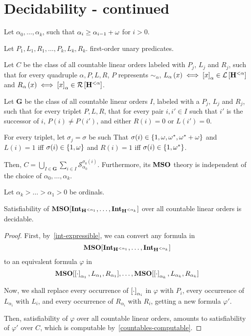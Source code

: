 \section{Decidability - continued}

\begin{lemma}\label{many-ordinals-decomposition}
  Let $\alpha_0, \ldots, \alpha_k$,
  such that $\alpha_{i} \ge \alpha_{i - 1} + \omega$ for $i > 0$.

  Let $P_1, L_1, R_1, \ldots, P_k, L_k, R_k$.
  first-order unary predicates.

  Let $C$ be the class of
  all countable linear orders labeled with $P_j$, $L_j$ and $R_j$,
  such that for every quadruple $\alpha, P, L, R$,
  $P$ represents $\sim_{\alpha}$,
  $L_{\alpha} \left( {x} \right) \iff \left[ {x} \right]_{\alpha} \in \mathcal{L} \left[ {{\mathbf{H}_{}^{< \alpha}}} \right]$ and
  $R_{\alpha} \left( {x} \right) \iff \left[ {x} \right]_{\alpha} \in \mathcal{R} \left[ {{\mathbf{H}_{}^{< \alpha}}} \right]$.

  Let $\mathbf{G}$ be the class of all countable linear orders $I$,
  labeled with a $P_j$, $L_j$ and $R_j$,
  such that for every triplet $P, L, R$,
  that for every pair $i, i' \in I$ such that $i'$ is the successor of $i$,
  $P(i) \ne P(i')$,
  and either $R(i) = 0$ or $L(i') = 0$.

  For every triplet, let $\sigma_j = \sigma$ be such That
  $\sigma(i) \in \left\{ {1, \omega, \omega^\ast, \omega^\ast + \omega} \right\}$ and
  $L(i) = 1$ iff $\sigma(i) \in \left\{ {1, \omega} \right\}$ and
  $R(i) = 1$ iff $\sigma(i) \in \left\{ {1, \omega^\ast} \right\}$.

  Then, $C = \bigcup_{I \in \mathbf{G}} \sum_{i \in I} \mathcal{S}^{\sigma_0(i)}_{\alpha_0}$.
  Furthermore, its $\mathbf{MSO}$ theory is independent of the choice of
  $\alpha_0, \ldots, \alpha_k$.
\end{lemma}


\begin{theorem}\label{many-ordinals-satisfiability}
  Let $\alpha_k > \ldots > \alpha_1 > 0$ be ordinals.

  Satisfiability of $\mathbf{MSO}[\mathbf{Int}_{\mathbf{H}_{}^{< \alpha_1}}, \ldots, \mathbf{Int}_{\mathbf{H}_{}^{< \alpha_k}}]$
  over all countable linear orders is decidable.
\end{theorem}

\begin{proof}
  First, by~\cref{int-expressible}, we can convert
  any formula in
  \[
    \mathbf{MSO}[\mathbf{Int}_{\mathbf{H}_{}^{< \alpha_1}}, \ldots, \mathbf{Int}_{\mathbf{H}_{}^{< \alpha_k}}]
  \]
  to an equivalent formula $\varphi$ in
  \[
    \mathbf{MSO}[\left[ {\cdot} \right]_{\alpha_1}, L_{\alpha_1}, R_{\alpha_1}],
    \ldots,
    \mathbf{MSO}[\left[ {\cdot} \right]_{\alpha_k}, L_{\alpha_k}, R_{\alpha_k}]
  \]

  Now, we shall replace every occurrence of $\left[ {\cdot} \right]_{\alpha_i}$ in $\varphi$ with $P_i$,
  every occurrence of $L_{\alpha_i}$ with $L_i$,
  and every occurrence of $R_{\alpha_i}$ with $R_i$,
  getting a new formula $\varphi'$.

  Then, satisfiability of $\varphi$ over all countable linear orders,
  amounts to satisfiability of $\varphi'$ over $C$,
  which is computable by~\cref{countables-computable}.
\end{proof}

